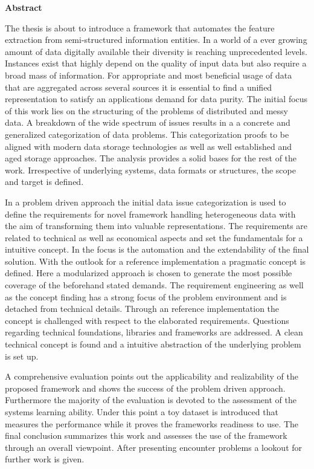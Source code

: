 \thispagestyle{empty}
\vspace*{1.0cm}

\begin{center}
    \textbf{Abstract}
\end{center}

\vspace*{0.5cm}

\noindent
The thesis is about to introduce a framework that automates the feature extraction from semi-structured information entities. In a world of a ever growing amount of data digitally available their diversity is reaching unprecedented levels. Instances exist that highly depend on the quality of input data but also require a broad mass of information. For appropriate and most beneficial usage of data that are aggregated across several sources it is essential to find a unified representation to satisfy an applications demand for data purity. The initial focus of this work lies on the structuring of the problems of distributed and messy data. A breakdown of the wide spectrum of issues results in a a concrete and generalized categorization of data problems.  This categorization proofs to be aligned with modern data storage technologies as well as well established and aged storage approaches. The analysis provides a solid bases for the rest of the work. Irrespective of underlying systems, data formats or structures, the scope and target is defined. 

In a problem driven approach the initial data issue categorization is used to define the requirements for novel framework handling heterogeneous data with the aim of transforming them into valuable representations. The requirements are related to technical as well as economical aspects and set the fundamentals for a intuitive concept. In the focus is the automation and the extendability of the final solution. With the outlook for a reference implementation a pragmatic concept is defined. Here a modularized approach is chosen to generate the most possible coverage of the beforehand stated demands. The requirement engineering as well as the concept finding has a strong focus of the problem environment and is detached from technical details. Through an reference implementation the concept is challenged with respect to the elaborated requirements. Questions regarding technical foundations, libraries and frameworks are addressed. A clean technical concept is found and a intuitive abstraction of the underlying problem is set up. 

A comprehensive evaluation points out the applicability and realizability of the proposed framework and shows the success of the problem driven approach. Furthermore the majority of the evaluation is devoted to the assessment of the systems learning ability. Under this point a toy dataset is introduced that measures the performance while it proves the frameworks readiness to use. The final conclusion summarizes this work and assesses the use of the framework through an overall viewpoint. After presenting encounter problems a lookout for further work is given.
